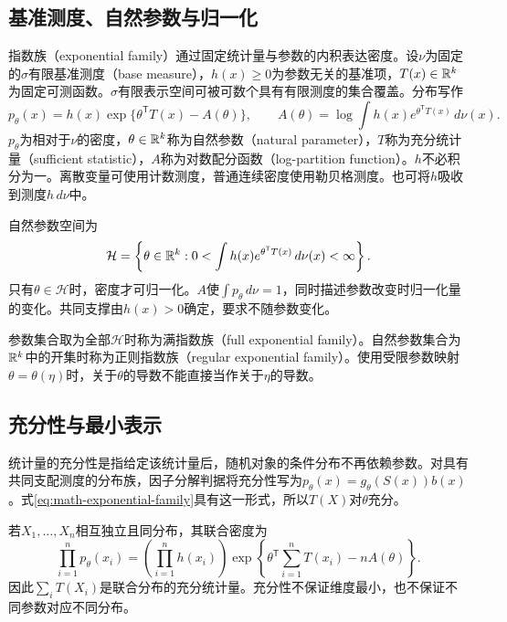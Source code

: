 \subsection{基准测度、自然参数与归一化}
指数族（exponential family）通过固定统计量与参数的内积表达密度。设$\nu$为固定的$\sigma$有限基准测度（base measure），$h(x)\geq0$为参数无关的基准项，$T(x)\in\mathbb{R}^k$为固定可测函数。$\sigma$有限表示空间可被可数个具有有限测度的集合覆盖。分布写作
\begin{equation}
 p_\theta(x)=h(x)\exp\{\theta^{\mathsf T}T(x)-A(\theta)\},\qquad
 A(\theta)=\log\int h(x)e^{\theta^{\mathsf T}T(x)}\,d\nu(x).
 \label{eq:math-exponential-family}
\end{equation}
$p_\theta$为相对于$\nu$的密度，$\theta\in\mathbb{R}^k$称为自然参数（natural parameter），$T$称为充分统计量（sufficient statistic），$A$称为对数配分函数（log-partition function）。$h$不必积分为一。离散变量可使用计数测度，普通连续密度使用勒贝格测度。也可将$h$吸收到测度$h\,d\nu$中。

自然参数空间为
\begin{equation}
 \mathcal H=\left\{\theta\in\mathbb{R}^k:
 0<\int h(x)e^{\theta^{\mathsf T}T(x)}\,d\nu(x)<\infty\right\}.
\end{equation}
只有$\theta\in\mathcal H$时，密度才可归一化。$A$使$\int p_\theta\,d\nu=1$，同时描述参数改变时归一化量的变化。共同支撑由$h(x)>0$确定，要求不随参数变化。

参数集合取为全部$\mathcal H$时称为满指数族（full exponential family）。自然参数集合为$\mathbb{R}^k$中的开集时称为正则指数族（regular exponential family）。使用受限参数映射$\theta=\theta(\eta)$时，关于$\theta$的导数不能直接当作关于$\eta$的导数。

\subsection{充分性与最小表示}
统计量的充分性是指给定该统计量后，随机对象的条件分布不再依赖参数。对具有共同支配测度的分布族，因子分解判据将充分性写为$p_\theta(x)=g_\theta(S(x))b(x)$。式\eqref{eq:math-exponential-family}具有这一形式，所以$T(X)$对$\theta$充分。

若$X_1,\ldots,X_n$相互独立且同分布，其联合密度为
\begin{equation}
 \prod_{i=1}^np_\theta(x_i)=\left(\prod_{i=1}^nh(x_i)\right)
 \exp\left\{\theta^{\mathsf T}\sum_{i=1}^nT(x_i)-nA(\theta)\right\}.
\end{equation}
因此$\sum_iT(X_i)$是联合分布的充分统计量。充分性不保证维度最小，也不保证不同参数对应不同分布。

